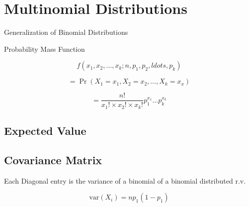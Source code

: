 
\section{Multinomial Distributions}

Generalization of Binomial Distributions

Probability Mass Function

\[ f(x_1,x_2,\ldots,x_k;n,p_1,p_2,ldots,p_k)\]

\[ = \Pr(X_1=x_1,X_2=x_2,\ldots,X_k=x_x) \]

\[ = \frac{n!}{x_1!\times x_2! \times x_k!} p_1^{x_1}\ldots p_k^{x_k} \]


\subsection{Expected Value}



\subsection{Covariance Matrix}

Each Diagonal entry is the variance of a binomial of a binomial distributed r.v.

\[ \mbox{var}(X_i) = np_1(1-p_1) \]
